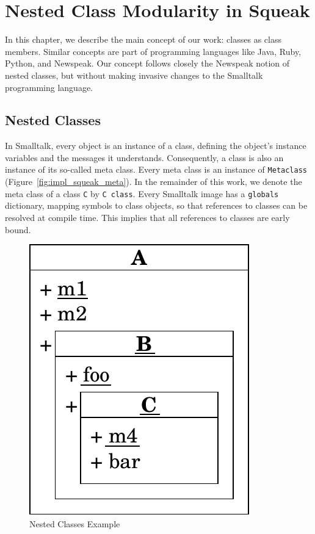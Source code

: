 \chapter{Nested Class Modularity in Squeak}
In this chapter, we describe the main concept of our work: classes as class members. Similar concepts are part of programming languages like Java, Ruby, Python, and Newspeak. Our concept follows closely the Newspeak notion of nested classes, but without making invasive changes to the Smalltalk programming language.

\section{Nested Classes}
In Smalltalk, every object is an instance of a class, defining the object's instance variables and the messages it understands. Consequently, a class is also an instance of its so-called meta class. Every meta class is an instance of \texttt{Metaclass} (Figure~\ref{fig:impl_squeak_meta}). In the remainder of this work, we denote the meta class of a class \texttt{C} by \texttt{C class}. Every Smalltalk image has a \texttt{globals} dictionary, mapping symbols to class objects, so that references to classes can be resolved at compile time. This implies that all references to classes are early bound.

\begin{figure}
	\includegraphics[scale=0.75]{nested_notation.pdf}
	\centering
	\caption{Nested Classes Example}
	\label{fig:concept_nested_notation}
\end{figure}

